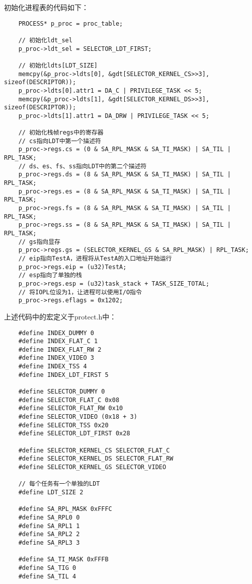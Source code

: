 \documentclass[a4paper,left=2.5cm,right=2.5cm,11pt]{report}
\begin{document}
	初始化进程表的代码如下：
	\begin{lstlisting}
	PROCESS* p_proc = proc_table;

	// 初始化ldt_sel
	p_proc->ldt_sel = SELECTOR_LDT_FIRST;

	// 初始化ldts[LDT_SIZE]
	memcpy(&p_proc->ldts[0], &gdt[SELECTOR_KERNEL_CS>>3], sizeof(DESCRIPTOR));
	p_proc->ldts[0].attr1 = DA_C | PRIVILEGE_TASK << 5;
	memcpy(&p_proc->ldts[1], &gdt[SELECTOR_KERNEL_DS>>3], sizeof(DESCRIPTOR));
	p_proc->ldts[1].attr1 = DA_DRW | PRIVILEGE_TASK << 5;

	// 初始化栈帧regs中的寄存器
	// cs指向LDT中第一个描述符
	p_proc->regs.cs = (0 & SA_RPL_MASK & SA_TI_MASK) | SA_TIL | RPL_TASK;
	// ds、es、fs、ss指向LDT中的第二个描述符
	p_proc->regs.ds = (8 & SA_RPL_MASK & SA_TI_MASK) | SA_TIL | RPL_TASK;
	p_proc->regs.es = (8 & SA_RPL_MASK & SA_TI_MASK) | SA_TIL | RPL_TASK;
	p_proc->regs.fs = (8 & SA_RPL_MASK & SA_TI_MASK) | SA_TIL | RPL_TASK;
	p_proc->regs.ss = (8 & SA_RPL_MASK & SA_TI_MASK) | SA_TIL | RPL_TASK;
	// gs指向显存
	p_proc->regs.gs = (SELECTOR_KERNEL_GS & SA_RPL_MASK) | RPL_TASK;
	// eip指向TestA，进程将从TestA的入口地址开始运行
	p_proc->regs.eip = (u32)TestA;
	// esp指向了单独的栈
	p_proc->regs.esp = (u32)task_stack + TASK_SIZE_TOTAL;
	// 将IOPL位设为1，让进程可以使用I/O指令
	p_proc->regs.eflags = 0x1202;
	\end{lstlisting}

	上述代码中的宏定义于protect.h中：
	\begin{lstlisting}
	#define INDEX_DUMMY 0
	#define INDEX_FLAT_C 1
	#define INDEX_FLAT_RW 2
	#define INDEX_VIDEO 3
	#define INDEX_TSS 4
	#define INDEX_LDT_FIRST 5

	#define SELECTOR_DUMMY 0
	#define SELECTOR_FLAT_C 0x08
	#define SELECTOR_FLAT_RW 0x10
	#define SELECTOR_VIDEO (0x18 + 3)
	#define SELECTOR_TSS 0x20
	#define SELECTOR_LDT_FIRST 0x28

	#define SELECTOR_KERNEL_CS SELECTOR_FLAT_C
	#define SELECTOR_KERNEL_DS SELECTOR_FLAT_RW
	#define SELECTOR_KERNEL_GS SELECTOR_VIDEO

	// 每个任务有一个单独的LDT
	#define LDT_SIZE 2

	#define SA_RPL_MASK 0xFFFC
	#define SA_RPL0 0
	#define SA_RPL1 1
	#define SA_RPL2 2
	#define SA_RPL3 3

	#define SA_TI_MASK 0xFFFB
	#define SA_TIG 0
	#define SA_TIL 4
	\end{lstlisting}
\end{document}
